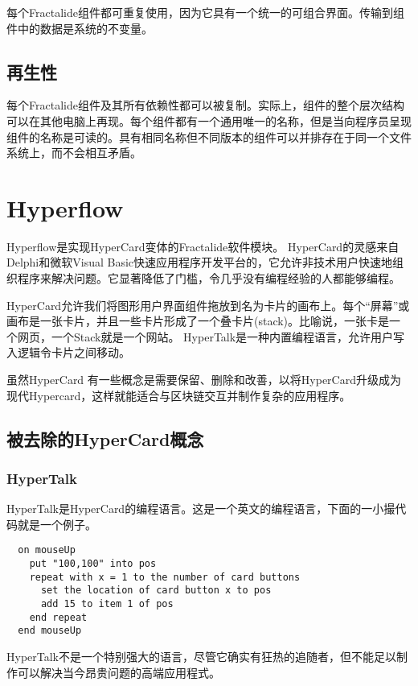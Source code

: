 \documentclass[%
 aip,
 jmp,
 amsmath,amssymb,
 preprint,
 reprint,
 author-year,
 author-numerical,
]{revtex4-1}
\begin{document}
\begin{CJK}{UTF8}{gbsn}
每个Fractalide组件都可重复使用，因为它具有一个统一的可组合界面。传输到组件中的数据是系统的不变量。

\subsection{\label{sec:reproducibility}再生性}

每个Fractalide组件及其所有依赖性都可以被复制。实际上，组件的整个层次结构可以在其他电脑上再现。每个组件都有一个通用唯一的名称，但是当向程序员呈现组件的名称是可读的。具有相同名称但不同版本的组件可以并排存在于同一个文件系统上，而不会相互矛盾。

\section{\label{sec:Hyperflow}Hyperflow}

Hyperflow是实现HyperCard变体的Fractalide软件模块。 HyperCard的灵感来自Delphi和微软Visual Basic快速应用程序开发平台的，它允许非技术用户快速地组织程序来解决问题。它显著降低了门槛，令几乎没有编程经验的人都能够编程。

HyperCard允许我们将图形用户界面组件拖放到名为卡片的画布上。每个“屏幕”或画布是一张卡片，并且一些卡片形成了一个叠卡片(stack)。比喻说，一张卡是一个网页，一个Stack就是一个网站。 HyperTalk是一种内置编程语言，允许用户写入逻辑令卡片之间移动。

虽然HyperCard 有一些概念是需要保留、删除和改善，以将HyperCard升级成为现代Hypercard，这样就能适合与区块链交互并制作复杂的应用程序。

\subsection{\label{sec:concepts to remove from hypercard}被去除的HyperCard概念}
\subsubsection{\label{sec:HyperTalk}HyperTalk}

HyperTalk是HyperCard的编程语言。这是一个英文的编程语言，下面的一小撮代码就是一个例子。

\begin{lstlisting}
  on mouseUp
    put "100,100" into pos
    repeat with x = 1 to the number of card buttons
      set the location of card button x to pos
      add 15 to item 1 of pos
    end repeat
  end mouseUp
\end{lstlisting}

HyperTalk不是一个特别强大的语言，尽管它确实有狂热的追随者，但不能足以制作可以解决当今昂贵问题的高端应用程式。


\end{CJK}
\end{document}
